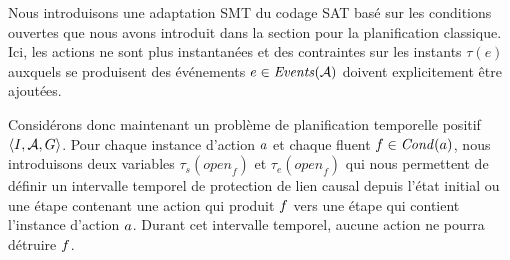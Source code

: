 Nous introduisons une adaptation SMT du codage SAT basé sur les conditions ouvertes que nous avons introduit dans la section  pour la planification classique. Ici, les actions ne sont plus instantanées et des contraintes sur les instants $\tau(e)$ auxquels se produisent des événements $e\in\mathit{Events}(\mathcal{A})$ doivent explicitement être ajoutées.


Considérons donc maintenant un problème de planification temporelle positif $\langle I, \mathcal{A}, G \rangle$.
Pour chaque instance d'action $a$ et chaque fluent $f\in \mathit{Cond}(a)$, nous introduisons deux variables $\tau_{s}(\textit{open}_{f})$ et $\tau_{e}(\textit{open}_{f})$ qui nous permettent de définir un intervalle temporel de protection de lien causal depuis l'état initial ou une étape contenant une action qui produit $f$ vers une étape qui contient l'instance d'action $a$. Durant cet intervalle temporel, aucune action ne pourra détruire $f$.




